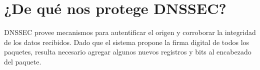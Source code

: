 \chapter{¿De qué nos protege DNSSEC?}
DNSSEC provee mecanismos para autentificar el origen y corroborar la integridad de los datos recibidos. Dado que el sistema propone la firma digital de todos los paquetes, resulta necesario agregar algunos nuevos registros y bits al encabezado del paquete.